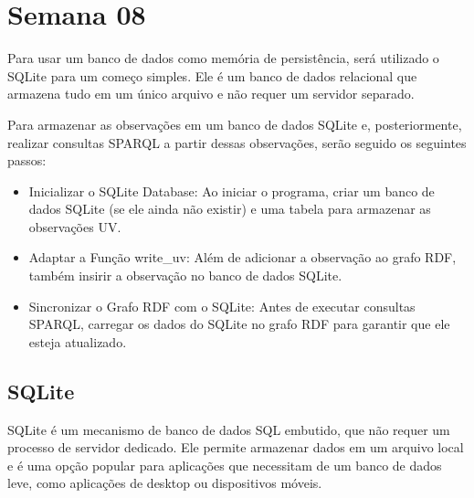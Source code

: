 \section{Semana 08}


Para usar um banco de dados como memória de persistência, será utilizado o SQLite para um começo simples. Ele é um banco de dados relacional que armazena tudo em um único arquivo e não requer um servidor separado.

Para armazenar as observações em um banco de dados SQLite e, posteriormente, realizar consultas SPARQL a partir dessas observações, serão seguido os seguintes passos:

\begin{itemize}
    \item Inicializar o SQLite Database: Ao iniciar o programa, criar um banco de dados SQLite (se ele ainda não existir) e uma tabela para armazenar as observações UV.
    \item Adaptar a Função write\_uv: Além de adicionar a observação ao grafo RDF, também insirir a observação no banco de dados SQLite.
    \item Sincronizar o Grafo RDF com o SQLite: Antes de executar consultas SPARQL, carregar os dados do SQLite no grafo RDF para garantir que ele esteja atualizado.
\end{itemize}

\subsection{SQLite}

SQLite é um mecanismo de banco de dados SQL embutido, que não requer um processo de servidor dedicado. Ele permite armazenar dados em um arquivo local e é uma opção popular para aplicações que necessitam de um banco de dados leve, como aplicações de desktop ou dispositivos móveis.

